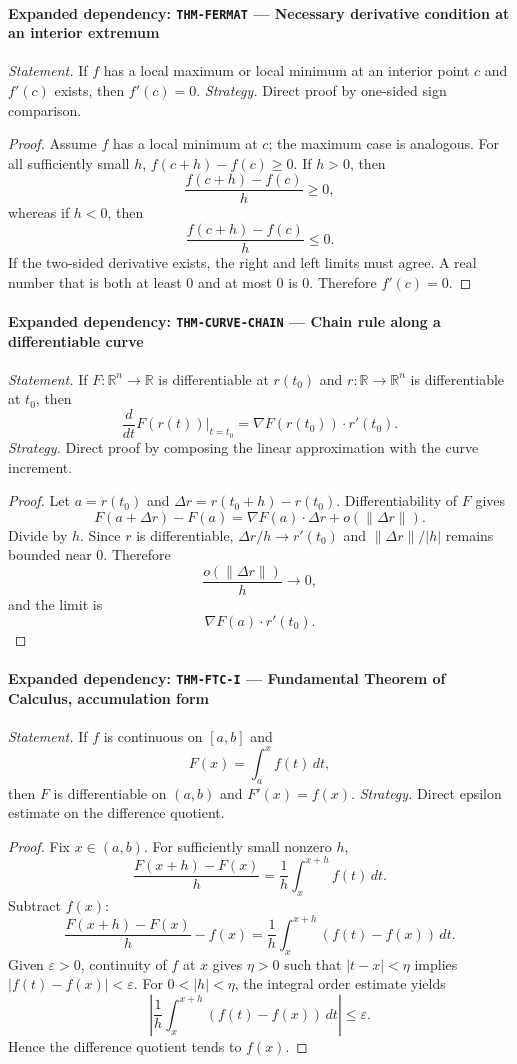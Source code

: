 \documentclass[10pt]{article}
\newcommand{\pidraw}[1]{\begingroup\urlstyle{tt}\nolinkurl{#1}\endgroup}
\theoremstyle{definition}
\theoremstyle{remark}
\begin{document}
\paragraph{Expanded dependency: \pidraw{THM-FERMAT} --- Necessary derivative condition at an interior extremum}
\textit{Statement.} If $f$ has a local maximum or local minimum at an interior point $c$ and $f'(c)$ exists, then $f'(c)=0$.
\textit{Strategy.} Direct proof by one-sided sign comparison.
\begin{proof}Assume $f$ has a local minimum at $c$; the maximum case is analogous.
For all sufficiently small $h$,
$f(c+h)-f(c)\ge0$. If $h>0$, then
\[
\frac{f(c+h)-f(c)}{h}\ge0,
\]
whereas if $h<0$, then
\[
\frac{f(c+h)-f(c)}{h}\le0.
\]
If the two-sided derivative exists, the right and left limits must agree.
A real number that is both at least $0$ and at most $0$ is $0$.
Therefore $f'(c)=0$.\end{proof}

\paragraph{Expanded dependency: \pidraw{THM-CURVE-CHAIN} --- Chain rule along a differentiable curve}
\textit{Statement.} If $F:\mathbb{R}^n\to\mathbb{R}$ is differentiable at $r(t_0)$ and
$r:\mathbb{R}\to\mathbb{R}^n$ is differentiable at $t_0$, then
\[
\frac{d}{dt}F(r(t))\Big|_{t=t_0}
=
\nabla F(r(t_0))\cdot r'(t_0).
\]
\textit{Strategy.} Direct proof by composing the linear approximation with the curve increment.
\begin{proof}Let $a=r(t_0)$ and $\Delta r=r(t_0+h)-r(t_0)$. Differentiability of $F$ gives
\[
F(a+\Delta r)-F(a)=\nabla F(a)\cdot\Delta r+o(\|\Delta r\|).
\]
Divide by $h$. Since $r$ is differentiable,
$\Delta r/h\to r'(t_0)$ and $\|\Delta r\|/|h|$ remains bounded near $0$.
Therefore
\[
\frac{o(\|\Delta r\|)}{h}\to0,
\]
and the limit is
\[
\nabla F(a)\cdot r'(t_0).
\]\end{proof}

\paragraph{Expanded dependency: \pidraw{THM-FTC-I} --- Fundamental Theorem of Calculus, accumulation form}
\textit{Statement.} If $f$ is continuous on $[a,b]$ and
\[
F(x)=\int_a^x f(t)\,dt,
\]
then $F$ is differentiable on $(a,b)$ and $F'(x)=f(x)$.
\textit{Strategy.} Direct epsilon estimate on the difference quotient.
\begin{proof}Fix $x\in(a,b)$. For sufficiently small nonzero $h$,
\[
\frac{F(x+h)-F(x)}{h}
=
\frac1h\int_x^{x+h}f(t)\,dt.
\]
Subtract $f(x)$:
\[
\frac{F(x+h)-F(x)}{h}-f(x)
=
\frac1h\int_x^{x+h}(f(t)-f(x))\,dt.
\]
Given $\varepsilon>0$, continuity of $f$ at $x$ gives $\eta>0$ such that
$|t-x|<\eta$ implies $|f(t)-f(x)|<\varepsilon$. For $0<|h|<\eta$, the
integral order estimate yields
\[
\left|
\frac1h\int_x^{x+h}(f(t)-f(x))\,dt
\right|
\le \varepsilon.
\]
Hence the difference quotient tends to $f(x)$.\end{proof}
\end{document}
